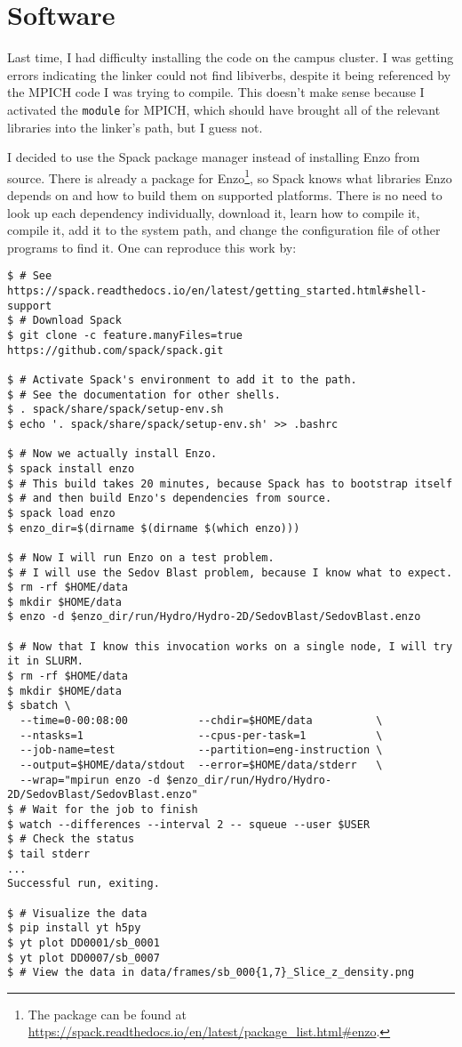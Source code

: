 \section*{Software}

Last time, I had difficulty installing the code on the campus cluster. I was getting errors indicating the linker could not find libiverbs, despite it being referenced by the MPICH code I was trying to compile. This doesn't make sense because I activated the \texttt{module} for MPICH, which should have brought all of the relevant libraries into the linker's path, but I guess not.

I decided to use the Spack package manager\cite{gamblin_spack_2015} instead of installing Enzo from source.
There is already a package for Enzo\footnote{The package can be found at \url{https://spack.readthedocs.io/en/latest/package_list.html\#enzo}.}, so Spack knows what libraries Enzo depends on and how to build them on supported platforms. There is no need to look up each dependency individually, download it, learn how to compile it, compile it, add it to the system path, and change the configuration file of other programs to find it. One can reproduce this work by:

\begin{verbatim}
$ # See https://spack.readthedocs.io/en/latest/getting_started.html#shell-support
$ # Download Spack
$ git clone -c feature.manyFiles=true https://github.com/spack/spack.git

$ # Activate Spack's environment to add it to the path.
$ # See the documentation for other shells.
$ . spack/share/spack/setup-env.sh
$ echo '. spack/share/spack/setup-env.sh' >> .bashrc

$ # Now we actually install Enzo.
$ spack install enzo
$ # This build takes 20 minutes, because Spack has to bootstrap itself
$ # and then build Enzo's dependencies from source.
$ spack load enzo
$ enzo_dir=$(dirname $(dirname $(which enzo)))

$ # Now I will run Enzo on a test problem.
$ # I will use the Sedov Blast problem, because I know what to expect.
$ rm -rf $HOME/data
$ mkdir $HOME/data
$ enzo -d $enzo_dir/run/Hydro/Hydro-2D/SedovBlast/SedovBlast.enzo

$ # Now that I know this invocation works on a single node, I will try it in SLURM.
$ rm -rf $HOME/data
$ mkdir $HOME/data
$ sbatch \
  --time=0-00:08:00           --chdir=$HOME/data          \
  --ntasks=1                  --cpus-per-task=1           \
  --job-name=test             --partition=eng-instruction \
  --output=$HOME/data/stdout  --error=$HOME/data/stderr   \
  --wrap="mpirun enzo -d $enzo_dir/run/Hydro/Hydro-2D/SedovBlast/SedovBlast.enzo"
$ # Wait for the job to finish
$ watch --differences --interval 2 -- squeue --user $USER
$ # Check the status
$ tail stderr
...
Successful run, exiting.

$ # Visualize the data
$ pip install yt h5py
$ yt plot DD0001/sb_0001
$ yt plot DD0007/sb_0007
$ # View the data in data/frames/sb_000{1,7}_Slice_z_density.png
\end{verbatim}


